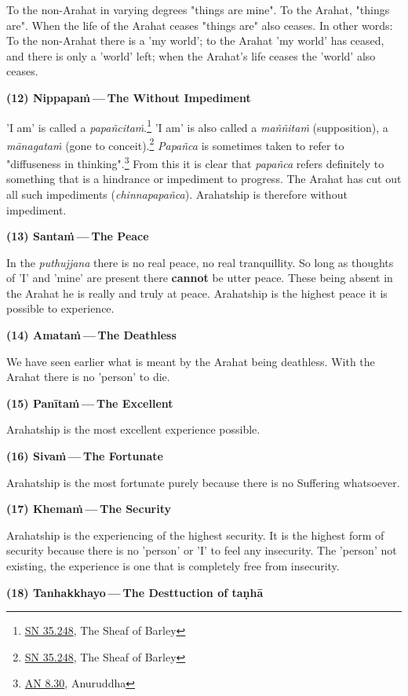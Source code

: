 To the non-Arahat in varying degrees "things are mine". To the Arahat,
"things are". When the life of the Arahat ceases "things are" also
ceases. In other words: To the non-Arahat there is a 'my world'; to the
Arahat 'my world' has ceased, and there is only a 'world' left; when the
Arahat’s life ceases the 'world' also ceases.


\textbf{(12) Nippapaṁ — The Without Impediment}


'I am' is called a \emph{papañcitaṁ}.\footnote{\href{https://suttacentral.net/sn35.248/en/bodhi}{SN 35.248}, The Sheaf of Barley}
'I am' is also called a \emph{maññitaṁ} (supposition), a \emph{mānagataṁ} (gone to conceit).\footnote{\href{https://suttacentral.net/sn35.248/en/bodhi}{SN 35.248}, The Sheaf of Barley}
 \emph{Papañca} is sometimes taken to refer to "diffuseness in thinking".\footnote{\href{https://suttacentral.net/an8.30/en/bodhi}{AN 8.30}, Anuruddha}
From this it is clear that \emph{papañca}
refers definitely to something that is a hindrance or impediment to
progress. The Arahat has cut out all such impediments
(\emph{chinnapapañca}). Arahatship is therefore without impediment.


\textbf{(13) Santaṁ — The Peace}


In the \emph{puthujjana} there is no real peace, no real tranquillity. So long
as thoughts of 'I' and 'mine' are present there \textbf{cannot} be utter peace.
These being absent in the Arahat he is really and truly at peace.
Arahatship is the highest peace it is possible to experience.


\textbf{(14) Amataṁ — The Deathless}


We have seen earlier what is meant by the Arahat being deathless. With
the Arahat there is no 'person' to die.


\textbf{(15) Panītaṁ — The Excellent}


Arahatship is the most excellent experience possible.


\textbf{(16) Sivaṁ — The Fortunate}


Arahatship is the most fortunate purely because there is no Suffering
whatsoever.


\textbf{(17) Khemaṁ — The Security}


Arahatship is the experiencing of the highest security. It is the
highest form of security because there is no 'person' or 'I' to feel any
insecurity. The 'person' not existing, the experience is one that is
completely free from insecurity.


\textbf{(18) Tanhakkhayo — The Desttuction of taṇhā}


